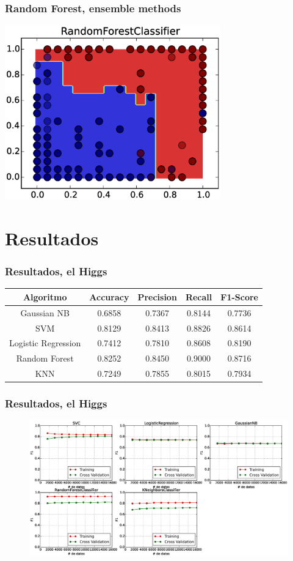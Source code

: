 \documentclass[10pt]{beamer}
\begin{document}
\begin{frame}
	\frametitle{Random Forest, ensemble methods}
	\centering\includegraphics[width=0.7\textwidth]{curva_decision_RF}
\end{frame}

\section{Resultados}

\begin{frame}
	\frametitle{Resultados, el Higgs}
	\begin{table}[htbp]
		\centering
		\begin{tabular}{ccccc}
		  \toprule
			Algoritmo & Accuracy & Precision & Recall & F1-Score \\
			\midrule
			Gaussian NB & 0.6858 & 0.7367 & 0.8144 & 0.7736 \\
			SVM & 0.8129 & 0.8413 & 0.8826 & 0.8614 \\
			Logistic Regression & 0.7412 & 0.7810 & 0.8608 & 0.8190 \\
			Random Forest & 0.8252 & 0.8450 & 0.9000 & 0.8716 \\
			KNN & 0.7249 & 0.7855 & 0.8015 & 0.7934 \\
			\bottomrule
			\end{tabular}
\end{table}
\end{frame}

\begin{frame}
	\frametitle{Resultados, el Higgs}
	\begin{figure}[htbp]
		\centering
		\includegraphics[width=1.00\textwidth]{higgs,_curvas_de_aprendizaje_post_CV}
	\end{figure}
\end{frame}
	
\end{document}

